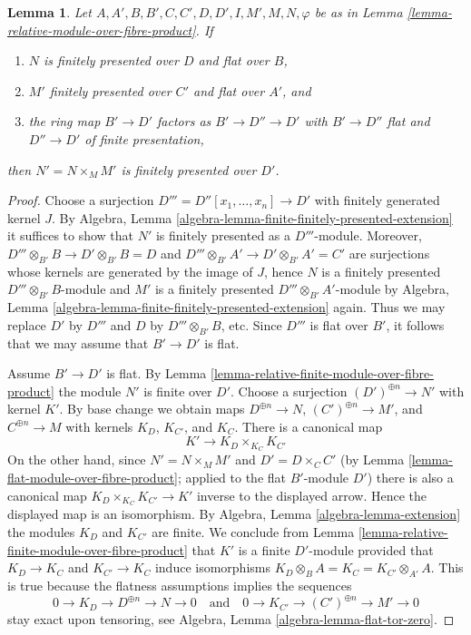 \documentclass[10pt,a4paper]{amsart}
\theoremstyle{plain}
\newtheorem{lemma}[subsection]{Lemma}
\theoremstyle{definition}
\theoremstyle{remark}
\numberwithin{equation}{subsection}
\begin{document}
\begin{lemma}
\label{lemma-relative-finitely-presented-module-over-fibre-product}
Let $A, A', B, B', C, C', D, D', I, M', M, N, \varphi$ be as in
Lemma \ref{lemma-relative-module-over-fibre-product}. If
\begin{enumerate}
\item $N$ is finitely presented over $D$ and flat over $B$,
\item $M'$ finitely presented over $C'$ and flat over $A'$, and
\item the ring map $B' \to D'$ factors as $B' \to D'' \to D'$
with $B' \to D''$ flat and $D'' \to D'$ of finite presentation,
\end{enumerate}
then $N' = N \times_M M'$ is finitely presented over $D'$.
\end{lemma}

\begin{proof}
Choose a surjection $D''' = D''[x_1, \ldots, x_n] \to D'$ with
finitely generated kernel $J$.
By Algebra, Lemma \ref{algebra-lemma-finite-finitely-presented-extension}
it suffices to show that $N'$ is finitely presented as a
$D'''$-module. Moreover, $D''' \otimes_{B'} B \to D' \otimes_{B'} B = D$
and $D''' \otimes_{B'} A' \to D' \otimes_{B'} A' = C'$ are surjections
whose kernels are generated by the image of $J$, hence $N$ is a
finitely presented $D''' \otimes_{B'} B$-module and
$M'$ is a finitely presented $D''' \otimes_{B'} A'$-module by
Algebra, Lemma \ref{algebra-lemma-finite-finitely-presented-extension}
again. Thus we may replace $D'$ by $D'''$ and $D$ by
$D''' \otimes_{B'} B$, etc. Since $D'''$ is
flat over $B'$, it follows that we may assume that $B' \to D'$ is flat.

\medskip\noindent
Assume $B' \to D'$ is flat.
By Lemma \ref{lemma-relative-finite-module-over-fibre-product}
the module $N'$ is finite over $D'$. Choose a surjection
$(D')^{\oplus n} \to N'$ with kernel $K'$. By base change we obtain maps
$D^{\oplus n} \to N$, $(C')^{\oplus n} \to M'$, and $C^{\oplus n} \to M$
with kernels $K_D$, $K_{C'}$, and $K_C$. There is a canonical map
$$
K' \longrightarrow K_D \times_{K_C} K_{C'}
$$
On the other hand, since $N' = N \times_M M'$ and
$D' = D \times_C C'$ (by Lemma \ref{lemma-flat-module-over-fibre-product};
applied to the flat $B'$-module $D'$)
there is also a
canonical map $K_D \times_{K_C} K_{C'} \to K'$ inverse to the displayed
arrow. Hence the displayed map is an isomorphism. By
Algebra, Lemma \ref{algebra-lemma-extension}
the modules $K_D$ and $K_{C'}$ are finite. We conclude from
Lemma \ref{lemma-relative-finite-module-over-fibre-product}
that $K'$ is a finite $D'$-module provided that $K_D \to K_C$ and
$K_{C'} \to K_C$ induce isomorphisms
$K_D \otimes_B A = K_C = K_{C'} \otimes_{A'} A$.
This is true because the flatness assumptions implies the sequences
$$
0 \to K_D \to D^{\oplus n} \to N \to 0
\quad\text{and}\quad
0 \to K_{C'} \to (C')^{\oplus n} \to M' \to 0
$$
stay exact upon tensoring, see
Algebra, Lemma \ref{algebra-lemma-flat-tor-zero}.
\end{proof}
\end{document}
